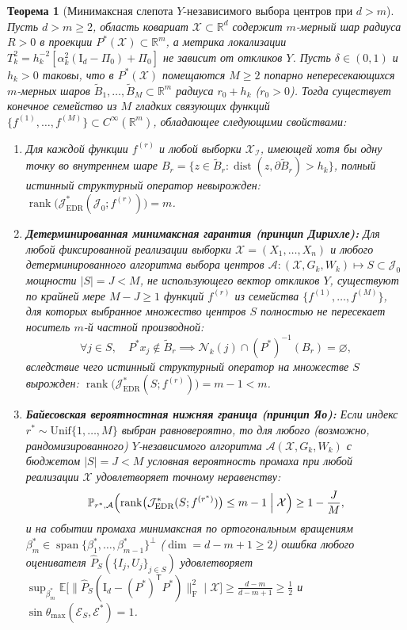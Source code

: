 \documentclass[11pt,a4paper]{article}
\newcommand{\R}{\mathbb{R}}
\newcommand{\E}{\mathbb{E}}
\newcommand{\Prob}{\mathbb{P}}
\newcommand{\Id}{\mathrm{I}}
\newcommand{\T}{^{\mathsf{T}}}
\newcommand{\F}{_{\mathrm{F}}}
\newcommand{\TEDR}{T}
\newcommand{\PEDRs}{P^{*}}
\newcommand{\JEDR}{\mathcal{J}_{\mathrm{EDR}}}
\newcommand{\II}{\mathcal{I}}
\newcommand{\JJJ}{\mathcal{J}}
\DeclareMathOperator{\rank}{rank}
\newtheorem{theorem}{Теорема}[section]
\theoremstyle{definition}
\theoremstyle{remark}
\begin{document}
\begin{theorem}[Минимаксная слепота $Y$-независимого выбора центров при $d > m$]\label{thm:blindness}
Пусть $d > m \ge 2$, область ковариат $\mathcal{X} \subset \R^d$ содержит $m$-мерный шар радиуса $R > 0$ в проекции $\PEDRs(\mathcal{X}) \subset \R^m$, а метрика локализации $\TEDR_k^2 = h_k^{-2}[\alpha_k^2(\Id_d - \Pi_0) + \Pi_0]$ не зависит от откликов $Y$. Пусть $\delta \in (0, 1)$ и $h_k > 0$ таковы, что в $\PEDRs(\mathcal{X})$ помещаются $M \ge 2$ попарно непересекающихся $m$-мерных шаров $\widetilde{B}_1, \ldots, \widetilde{B}_M \subset \R^m$ радиуса $r_0 + h_k$ ($r_0 > 0$). Тогда существует конечное семейство из $M$ гладких связующих функций $\{f^{(1)}, \ldots, f^{(M)}\} \subset C^\infty(\R^m)$, обладающее следующими свойствами:
\begin{enumerate}
    \item Для каждой функции $f^{(r)}$ и любой выборки $\mathcal{X}_{\II}$, имеющей хотя бы одну точку во внутреннем шаре $B_r = \{z \in \widetilde{B}_r : \operatorname{dist}(z, \partial \widetilde{B}_r) > h_k\}$, полный истинный структурный оператор невырожден: $\rank\bigl(\JEDR^*(\JJJ_0; f^{(r)})\bigr) = m$.
    \item \textbf{Детерминированная минимаксная гарантия (принцип Дирихле):} Для \emph{любой} фиксированной реализации выборки $\mathcal{X} = (X_1, \ldots, X_n)$ и \emph{любого} детерминированного алгоритма выбора центров $\mathcal{A}: (\mathcal{X}, G_k, W_k) \mapsto S \subset \JJJ_0$ мощности $|S| = J < M$, не использующего вектор откликов $Y$, существуют по крайней мере $M - J \ge 1$ функций $f^{(r)}$ из семейства $\{f^{(1)}, \ldots, f^{(M)}\}$, для которых выбранное множество центров $S$ полностью не пересекает носитель $m$-й частной производной:
    \[
        \forall j \in S, \quad \PEDRs x_j \notin \widetilde{B}_r \implies \mathcal{N}_k(j) \cap (\PEDRs)^{-1}(B_r) = \varnothing,
    \]
    вследствие чего истинный структурный оператор на множестве $S$ вырожден: $\rank\bigl(\JEDR^*(S; f^{(r)})\bigr) = m - 1 < m$.
    \item \textbf{Байесовская вероятностная нижняя граница (принцип Яо):} Если индекс $r^* \sim \mathrm{Unif}\{1, \ldots, M\}$ выбран равновероятно, то для любого (возможно, рандомизированного) $Y$-независимого алгоритма $\mathcal{A}(\mathcal{X}, G_k, W_k)$ с бюджетом $|S| = J < M$ условная вероятность промаха при любой реализации $\mathcal{X}$ удовлетворяет точному неравенству:
    \begin{equation}\label{eq:yao_miss_prob}
        \Prob_{r^*, \mathcal{A}}\Bigl(\rank\bigl(\JEDR^*(S; f^{(r^*)})\bigr) \le m - 1 \;\Big|\; \mathcal{X}\Bigr) \ge 1 - \frac{J}{M},
    \end{equation}
    и на событии промаха минимаксная по ортогональным вращениям $\beta_m^* \in \operatorname{span}\{\beta_1^*, \ldots, \beta_{m-1}^*\}^\perp$ ($\dim = d - m + 1 \ge 2$) ошибка любого оценивателя $\hat{P}_S(\{I_j, U_j\}_{j \in S})$ удовлетворяет $\sup_{\beta_m^*} \E\bigl[\|\hat{P}_S(\Id_d - (\PEDRs)\T \PEDRs)\|\F^2 \mid \mathcal{X}\bigr] \ge \frac{d - m}{d - m + 1} \ge \frac{1}{2}$ и $\sin\theta_{\max}(\mathcal{E}_S, \mathcal{E}^*) = 1$.
\end{enumerate}
\end{theorem}
\end{document}
